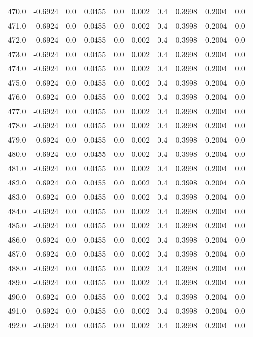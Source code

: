 \begin{longtable}{lrrrrrrrrr}
470.0 & -0.6924 & 0.0 & 0.0455 & 0.0 & 0.002 & 0.4 & 0.3998 & 0.2004 & 0.0 \\
471.0 & -0.6924 & 0.0 & 0.0455 & 0.0 & 0.002 & 0.4 & 0.3998 & 0.2004 & 0.0 \\
472.0 & -0.6924 & 0.0 & 0.0455 & 0.0 & 0.002 & 0.4 & 0.3998 & 0.2004 & 0.0 \\
473.0 & -0.6924 & 0.0 & 0.0455 & 0.0 & 0.002 & 0.4 & 0.3998 & 0.2004 & 0.0 \\
474.0 & -0.6924 & 0.0 & 0.0455 & 0.0 & 0.002 & 0.4 & 0.3998 & 0.2004 & 0.0 \\
475.0 & -0.6924 & 0.0 & 0.0455 & 0.0 & 0.002 & 0.4 & 0.3998 & 0.2004 & 0.0 \\
476.0 & -0.6924 & 0.0 & 0.0455 & 0.0 & 0.002 & 0.4 & 0.3998 & 0.2004 & 0.0 \\
477.0 & -0.6924 & 0.0 & 0.0455 & 0.0 & 0.002 & 0.4 & 0.3998 & 0.2004 & 0.0 \\
478.0 & -0.6924 & 0.0 & 0.0455 & 0.0 & 0.002 & 0.4 & 0.3998 & 0.2004 & 0.0 \\
479.0 & -0.6924 & 0.0 & 0.0455 & 0.0 & 0.002 & 0.4 & 0.3998 & 0.2004 & 0.0 \\
480.0 & -0.6924 & 0.0 & 0.0455 & 0.0 & 0.002 & 0.4 & 0.3998 & 0.2004 & 0.0 \\
481.0 & -0.6924 & 0.0 & 0.0455 & 0.0 & 0.002 & 0.4 & 0.3998 & 0.2004 & 0.0 \\
482.0 & -0.6924 & 0.0 & 0.0455 & 0.0 & 0.002 & 0.4 & 0.3998 & 0.2004 & 0.0 \\
483.0 & -0.6924 & 0.0 & 0.0455 & 0.0 & 0.002 & 0.4 & 0.3998 & 0.2004 & 0.0 \\
484.0 & -0.6924 & 0.0 & 0.0455 & 0.0 & 0.002 & 0.4 & 0.3998 & 0.2004 & 0.0 \\
485.0 & -0.6924 & 0.0 & 0.0455 & 0.0 & 0.002 & 0.4 & 0.3998 & 0.2004 & 0.0 \\
486.0 & -0.6924 & 0.0 & 0.0455 & 0.0 & 0.002 & 0.4 & 0.3998 & 0.2004 & 0.0 \\
487.0 & -0.6924 & 0.0 & 0.0455 & 0.0 & 0.002 & 0.4 & 0.3998 & 0.2004 & 0.0 \\
488.0 & -0.6924 & 0.0 & 0.0455 & 0.0 & 0.002 & 0.4 & 0.3998 & 0.2004 & 0.0 \\
489.0 & -0.6924 & 0.0 & 0.0455 & 0.0 & 0.002 & 0.4 & 0.3998 & 0.2004 & 0.0 \\
490.0 & -0.6924 & 0.0 & 0.0455 & 0.0 & 0.002 & 0.4 & 0.3998 & 0.2004 & 0.0 \\
491.0 & -0.6924 & 0.0 & 0.0455 & 0.0 & 0.002 & 0.4 & 0.3998 & 0.2004 & 0.0 \\
492.0 & -0.6924 & 0.0 & 0.0455 & 0.0 & 0.002 & 0.4 & 0.3998 & 0.2004 & 0.0 \\

\end{longtable}
